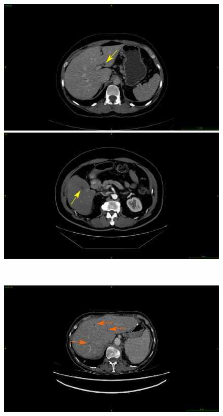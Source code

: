 \begin{figure}[!ht]
	\centering
	\begin{minipage}{0.45\linewidth}
		\includegraphics[width=\linewidth]{../Contributions/images/Artifacts/ResizeLITS_cyst}
	\end{minipage} \hspace{-0.1cm}
	\begin{minipage}{0.45\linewidth}
		\includegraphics[width=\linewidth]{../Contributions/images/Artifacts/ResizeTCIA_cyst}
	\end{minipage} \\
	\begin{minipage}{0.45\linewidth}
		\includegraphics[width=\linewidth]{../Contributions/images/Artifacts/ResizeLITS_fat}

\end{minipage}
\end{figure}
